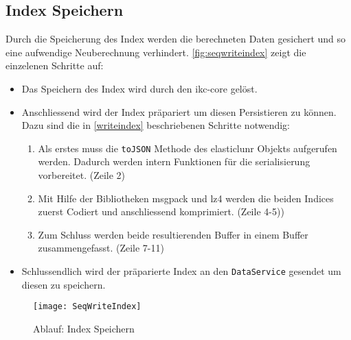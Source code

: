 \subsection{Index Speichern}
Durch die Speicherung des Index werden die berechneten Daten gesichert und so eine aufwendige Neuberechnung verhindert. \autoref{fig:seqwriteindex} zeigt die einzelenen Schritte auf:
\begin{itemize}
    \item Das Speichern des Index wird durch den \gls{ikc-core} gelöst.
    \item Anschliessend wird der Index präpariert um diesen Persistieren zu können. Dazu sind die in \autoref{writeindex} beschriebenen Schritte notwendig:
    \begin{enumerate}
        \item Als erstes muss die \texttt{toJSON} Methode des \gls{elasticlunr} Objekts aufgerufen werden. Dadurch werden intern Funktionen für die serialisierung vorbereitet. (Zeile 2)
        \item Mit Hilfe der Bibliotheken \gls{msgpack} und \gls{lz4} werden die beiden Indices zuerst Codiert und anschliessend komprimiert. (Zeile 4-5))
        \item Zum Schluss werden beide resultierenden Buffer in einem Buffer zusammengefasst. (Zeile 7-11)
    \end{enumerate}
    \item Schlussendlich wird der präparierte Index an den \texttt{DataService} gesendet um diesen zu speichern. 
\end{itemize}

    \begin{figure}[H]
    \centering
    \texttt{[image: SeqWriteIndex]}
    \caption{Ablauf: Index Speichern}
    \label{fig:seqwriteindex}
    \end{figure}

    
